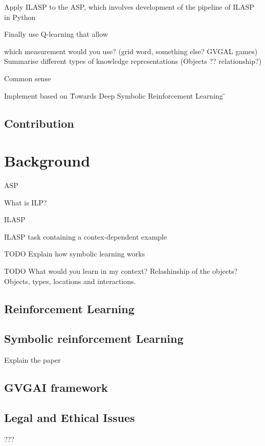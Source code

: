 \documentclass[12pt,twoside]{report}
\begin{document}
Apply ILASP to the ASP, which involves development of the pipeline of ILASP in Python

Finally use Q-learning that allow



which measurement would you use? (grid word, something else? GVGAL games)
Summarise different types of knowledge representations (Objects ?? relationship?)

Common sense

Implement based on \"Towards Deep Symbolic Reinforcement Learning \"

\section{Contribution}


\chapter{Background}

ASP

What is ILP?

ILASP


ILASP task containing a contex-dependent example



TODO Explain how symbolic learning works

TODO What would you learn in my context? Relashinship of the objects?
Objects, types, locations and interactions.


\section{Reinforcement Learning}


\section{Symbolic reinforcement Learning}


Explain the paper


\section{GVGAI framework}


\section{Legal and Ethical Issues}

???




%
%



\end{document}
